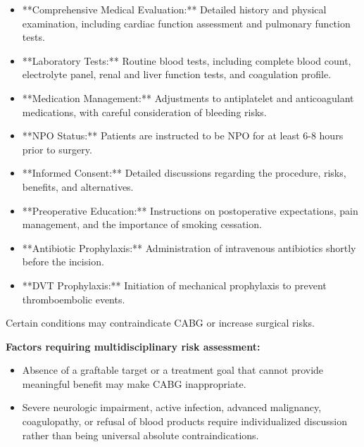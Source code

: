 \begin{itemize}
  \item **Comprehensive Medical Evaluation:** Detailed history and physical examination, including cardiac function assessment and pulmonary function tests.

  \item **Laboratory Tests:** Routine blood tests, including complete blood count, electrolyte panel, renal and liver function tests, and coagulation profile.

  \item **Medication Management:** Adjustments to antiplatelet and anticoagulant medications, with careful consideration of bleeding risks.

  \item **NPO Status:** Patients are instructed to be NPO for at least 6-8 hours prior to surgery.

  \item **Informed Consent:** Detailed discussions regarding the procedure, risks, benefits, and alternatives.

  \item **Preoperative Education:** Instructions on postoperative expectations, pain management, and the importance of smoking cessation.

  \item **Antibiotic Prophylaxis:** Administration of intravenous antibiotics shortly before the incision.

  \item **DVT Prophylaxis:** Initiation of mechanical prophylaxis to prevent thromboembolic events.
\end{itemize}

Certain conditions may contraindicate CABG or increase surgical risks.

\textbf{Factors requiring multidisciplinary risk assessment:}
\begin{itemize}
  \item Absence of a graftable target or a treatment goal that cannot provide meaningful benefit may make CABG inappropriate.
  \item Severe neurologic impairment, active infection, advanced malignancy, coagulopathy, or refusal of blood products require individualized discussion rather than being universal absolute contraindications.
\end{itemize}

